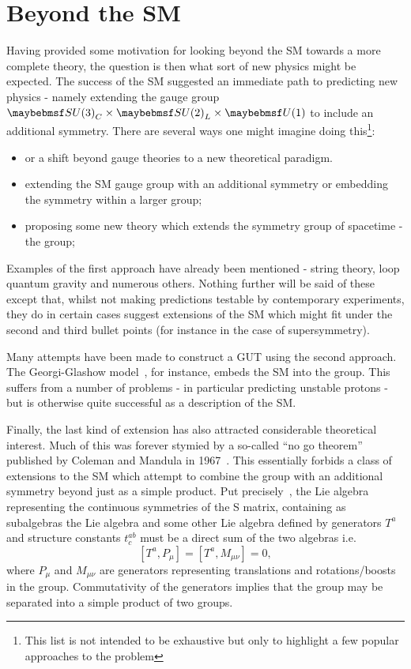 \section{Beyond the \acl{SM}}
Having provided some motivation for looking beyond the \ac{SM} towards a more
complete theory, the question is then what sort of new physics might be
expected. The success of the \ac{SM} suggested an immediate path to predicting
new physics - namely extending the gauge group
$\SUthree_C\times\SUtwo_L\times\Uone$ to include an additional symmetry. There
are several ways one might imagine doing this\footnote{This list is not intended
  to be exhaustive but only to highlight a few popular approaches to the problem}:
\begin{itemize}
\item or a shift beyond gauge theories to a new theoretical paradigm.
\item extending the \ac{SM} gauge group with an additional symmetry or embedding
  the symmetry within a larger group;
\item proposing some new theory which extends the symmetry group of spacetime -
  the \Poincare group;
\end{itemize}

Examples of the first approach have already been mentioned - string theory, loop
quantum gravity and numerous others. Nothing further will be said of these
except that, whilst not making predictions testable by contemporary experiments,
they do in certain cases suggest extensions of the \ac{SM} which might fit under
the second and third bullet points (for instance in the case of supersymmetry).

Many attempts have been made to construct a \acl{GUT} using the second
approach. The Georgi-Glashow model~\cite{georgi_glashow}, for instance, embeds
the \ac{SM} into the \SUfive group. This suffers from a number of problems - in
particular predicting unstable protons - but is otherwise quite successful as a
description of the \ac{SM}.

Finally, the last kind of extension has also attracted considerable theoretical
interest. Much of this was forever stymied by a so-called ``no go theorem''
published by Coleman and Mandula in 1967~\cite{coleman_mandula}. This
essentially forbids a class of extensions to the \ac{SM} which attempt to
combine the \Poincare group with an additional symmetry beyond just as a simple
product. Put precisely~\cite{sparticles}, the Lie algebra representing the
continuous symmetries of the S matrix, containing as subalgebras the \Poincare
Lie algebra and some other Lie algebra defined by generators $T^a$ and structure
constants $t^{ab}_c$ must be a direct sum of the two algebras i.e.
\begin{equation*}
\left[T^a, P_{\mu}\right] = \left[T^a, M_{\mu\nu}\right] = 0,
\end{equation*}
where $P_{\mu}$ and $M_{\mu\nu}$ are generators representing translations and
rotations/boosts in the \Poincare group. Commutativity of the generators implies
that the group may be separated into a simple product of two groups.

